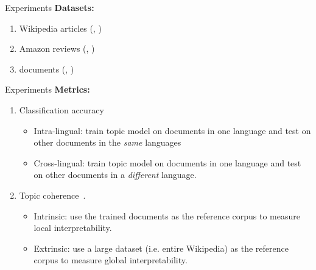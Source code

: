 \begin{frame}{Experiments}
\textbf{Datasets: }
    \begin{enumerate}
        \item Wikipedia articles (, )
        \item Amazon reviews (, ) 
        \item {} documents (, )
    \end{enumerate} 
\end{frame}

\begin{frame}{Experiments}
\textbf{Metrics: }
    \begin{enumerate}
        \item Classification accuracy
        \begin{itemize}
            \item Intra-lingual: train topic model on documents in one language and test on other documents in the \emph{same} languages
            \item Cross-lingual: train topic model on documents in one language and test on other documents in a \emph{different} language.
        \end{itemize}
        \item Topic coherence~\citep{lau-2014}.
        \begin{itemize}
            \item Intrinsic: use the trained documents as the reference corpus to measure local interpretability.
            \item Extrinsic: use a large dataset (i.e. entire Wikipedia) as the reference corpus to measure global interpretability. 
        \end{itemize}
    \end{enumerate}
\end{frame}

